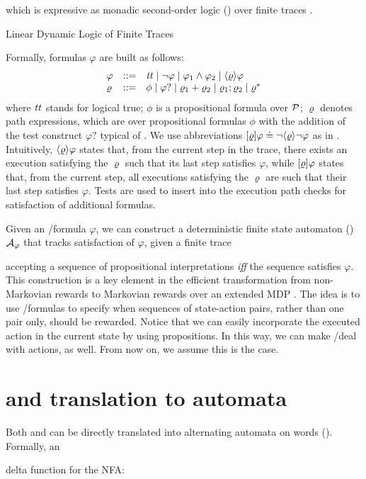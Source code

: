  which is expressive as monadic second-order logic 
(\MSO) over finite traces \citep{de2013linear}.

Linear Dynamic Logic of Finite
Traces

Formally, \LDLf formulas $\varphi$ are built as follows:
\[\begin{array}{lcl}
\varphi &::=& {\mathit{tt}}  \mid \lnot \varphi \mid \varphi_1 \land \varphi_2 \mid \langle \varrho \rangle\varphi \\
\varrho &::=& \phi \mid \varphi? \mid  \varrho_1 + \varrho_2 \mid \varrho_1; \varrho_2 \mid \varrho^*
\end{array}
\]
where ${\mathit{tt}}$ stands for logical true; $\phi$ is a propositional
formula over $\mathcal{P}$; $\varrho$ denotes path expressions, which are \REGEX over
propositional formulas $\phi$ with the addition of the test construct
$\varphi?$ typical of \PDL.  We use abbreviations
$[\varrho]\varphi\doteq\lnot\langle \varrho \rangle{\lnot\varphi}$ as in \PDL.
Intuitively, $\langle \varrho \rangle\varphi$ states that, from the current step
in the trace, there exists an execution satisfying the \REGEX $\varrho$ 
such that its last step satisfies $\varphi$, while
$[\varrho]\varphi$ states that, from the current step, all executions
satisfying the \REGEX $\varrho$ are such that their last step
satisfies $\varphi$.
Tests are used to insert into the execution path checks for
satisfaction of additional \LDLf formulas.
%
%

Given an \LTLf/\LDLf formula $\varphi$,
we can construct a deterministic finite state automaton (\DFA) \citep{RaSc59} 
$\mathcal{A}_\varphi$ that tracks satisfaction of $\varphi$, 
given a finite trace

accepting a sequence of propositional interpretations {\em
	iff} the sequence satisfies $\varphi$. This construction
is a key element in the efficient transformation from non-Markovian
rewards to Markovian rewards over an extended MDP \citep{BDP-AAAI18}.
%
The idea is to use \LTLf/\LDLf formulas to specify when sequences of 
state-action pairs, rather than one pair only, should be rewarded.
Notice that we can easily incorporate the executed action in the current state
by using propositions. In this way, we can make \LTLf/\LDLf deal with 
actions, as well. From now on, we assume this is the case.

\section{\LTLf and \LDLf translation to automata}
Both \LTLf and \LDLf can be directly translated into alternating automata on words (\AFW). Formally, an 



delta function for the NFA:





